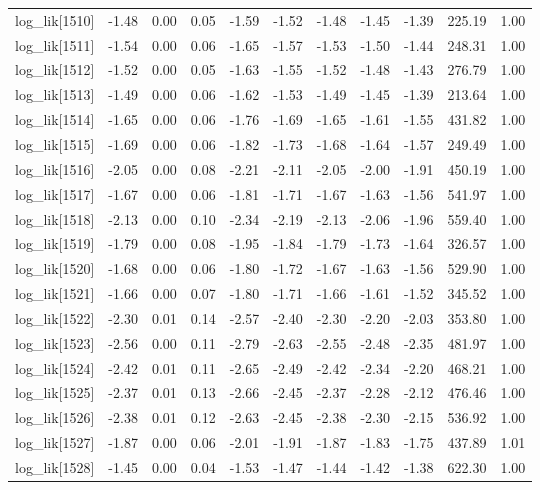\begin{table}[ht]
\begin{tabular}{rrrrrrrrrrr}
  log\_lik[1510] & -1.48 & 0.00 & 0.05 & -1.59 & -1.52 & -1.48 & -1.45 & -1.39 & 225.19 & 1.00 \\ 
  log\_lik[1511] & -1.54 & 0.00 & 0.06 & -1.65 & -1.57 & -1.53 & -1.50 & -1.44 & 248.31 & 1.00 \\ 
  log\_lik[1512] & -1.52 & 0.00 & 0.05 & -1.63 & -1.55 & -1.52 & -1.48 & -1.43 & 276.79 & 1.00 \\ 
  log\_lik[1513] & -1.49 & 0.00 & 0.06 & -1.62 & -1.53 & -1.49 & -1.45 & -1.39 & 213.64 & 1.00 \\ 
  log\_lik[1514] & -1.65 & 0.00 & 0.06 & -1.76 & -1.69 & -1.65 & -1.61 & -1.55 & 431.82 & 1.00 \\ 
  log\_lik[1515] & -1.69 & 0.00 & 0.06 & -1.82 & -1.73 & -1.68 & -1.64 & -1.57 & 249.49 & 1.00 \\ 
  log\_lik[1516] & -2.05 & 0.00 & 0.08 & -2.21 & -2.11 & -2.05 & -2.00 & -1.91 & 450.19 & 1.00 \\ 
  log\_lik[1517] & -1.67 & 0.00 & 0.06 & -1.81 & -1.71 & -1.67 & -1.63 & -1.56 & 541.97 & 1.00 \\ 
  log\_lik[1518] & -2.13 & 0.00 & 0.10 & -2.34 & -2.19 & -2.13 & -2.06 & -1.96 & 559.40 & 1.00 \\ 
  log\_lik[1519] & -1.79 & 0.00 & 0.08 & -1.95 & -1.84 & -1.79 & -1.73 & -1.64 & 326.57 & 1.00 \\ 
  log\_lik[1520] & -1.68 & 0.00 & 0.06 & -1.80 & -1.72 & -1.67 & -1.63 & -1.56 & 529.90 & 1.00 \\ 
  log\_lik[1521] & -1.66 & 0.00 & 0.07 & -1.80 & -1.71 & -1.66 & -1.61 & -1.52 & 345.52 & 1.00 \\ 
  log\_lik[1522] & -2.30 & 0.01 & 0.14 & -2.57 & -2.40 & -2.30 & -2.20 & -2.03 & 353.80 & 1.00 \\ 
  log\_lik[1523] & -2.56 & 0.00 & 0.11 & -2.79 & -2.63 & -2.55 & -2.48 & -2.35 & 481.97 & 1.00 \\ 
  log\_lik[1524] & -2.42 & 0.01 & 0.11 & -2.65 & -2.49 & -2.42 & -2.34 & -2.20 & 468.21 & 1.00 \\ 
  log\_lik[1525] & -2.37 & 0.01 & 0.13 & -2.66 & -2.45 & -2.37 & -2.28 & -2.12 & 476.46 & 1.00 \\ 
  log\_lik[1526] & -2.38 & 0.01 & 0.12 & -2.63 & -2.45 & -2.38 & -2.30 & -2.15 & 536.92 & 1.00 \\ 
  log\_lik[1527] & -1.87 & 0.00 & 0.06 & -2.01 & -1.91 & -1.87 & -1.83 & -1.75 & 437.89 & 1.01 \\ 
  log\_lik[1528] & -1.45 & 0.00 & 0.04 & -1.53 & -1.47 & -1.44 & -1.42 & -1.38 & 622.30 & 1.00 \\ 

\end{tabular}
\end{table}
